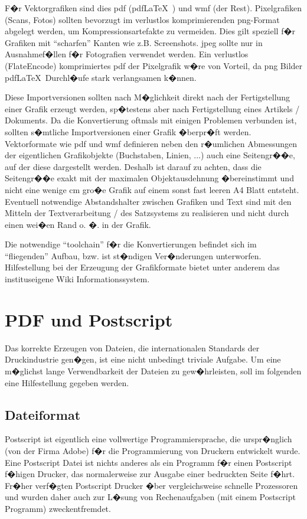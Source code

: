 F�r Vektorgrafiken sind dies pdf (pdf\LaTeX\ ) und wmf (der Rest). Pixelgrafiken (Scans,
Fotos) sollten bevorzugt im verlustlos komprimierenden png-Format abgelegt werden, um
Kompressionsartefakte zu vermeiden. Dies gilt speziell f�r Grafiken mit "`scharfen"' Kanten wie
z.B. Screenshots. jpeg sollte nur in Ausnahmef�llen f�r Fotografien verwendet werden. Ein
verlustlos (FlateEncode) komprimiertes pdf der Pixelgrafik w�re von Vorteil, da png Bilder
pdf\LaTeX\  Durchl�ufe stark verlangsamen k�nnen.

Diese Importversionen sollten nach M�glichkeit direkt nach der Fertigstellung einer Grafik erzeugt
werden, sp�testens aber nach Fertigstellung eines Artikels / Dokuments. Da die Konvertierung
oftmals mit einigen Problemen verbunden ist, sollten s�mtliche Importversionen einer Grafik
�berpr�ft werden. Vektorformate wie pdf und wmf definieren neben den r�umlichen Abmessungen der
eigentlichen Grafikobjekte (Buchstaben, Linien, ...) auch eine Seitengr��e, auf der diese
dargestellt werden. Deshalb ist darauf zu achten, dass die Seitengr��e exakt mit der maximalen
Objektausdehnung �bereinstimmt und nicht eine wenige cm gro�e Grafik auf einem sonst fast leeren A4
Blatt entsteht. Eventuell notwendige Abstandshalter zwischen Grafiken und Text sind mit den Mitteln
der Textverarbeitung / des Satzsystems zu realisieren und nicht durch einen wei�en Rand o. �. in
der Grafik.

Die notwendige "`toolchain"' f�r die Konvertierungen befindet sich im "`fliegenden"' Aufbau, bzw.
ist st�ndigen Ver�nderungen unterworfen. Hilfestellung bei der Erzeugung der Grafikformate bietet
unter anderem das instituseigene Wiki Informationssystem.

\chapter{PDF und Postscript}\label{sec:pdfundps}

Das korrekte Erzeugen von Dateien, die internationalen Standards der Druckindustrie gen�gen, ist
eine nicht unbedingt triviale Aufgabe. Um eine m�glichst lange Verwendbarkeit der Dateien zu
gew�hrleisten, soll im folgenden eine Hilfestellung gegeben werden.

\section{Dateiformat}
Postscript ist eigentlich eine vollwertige Programmiersprache, die urspr�nglich (von der Firma Adobe) f�r die Programmierung von Druckern entwickelt wurde.
Eine Postscript Datei ist nichts anderes als ein Programm f�r einen Postscript f�higen Drucker, das normalerweise zur Ausgabe einer bedruckten Seite f�hrt. Fr�her verf�gten Postscript Drucker �ber vergleichsweise schnelle Prozessoren und wurden daher auch zur L�sung von Rechenaufgaben (mit einem Postscript Programm) zweckentfremdet.

